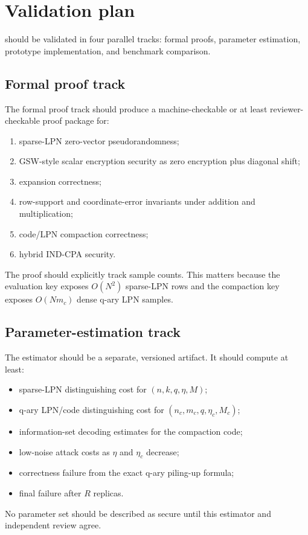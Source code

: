 \section{Validation plan}

\sable{} should be validated in four parallel tracks: formal proofs, parameter estimation, prototype implementation, and benchmark comparison.

\subsection{Formal proof track}

The formal proof track should produce a machine-checkable or at least reviewer-checkable proof package for:
\begin{enumerate}
    \item sparse-LPN zero-vector pseudorandomness;
    \item GSW-style scalar encryption security as zero encryption plus diagonal shift;
    \item expansion correctness;
    \item row-support and coordinate-error invariants under addition and multiplication;
    \item code/LPN compaction correctness;
    \item hybrid IND-CPA security.
\end{enumerate}
The proof should explicitly track sample counts.  This matters because the evaluation key exposes $O(N^2)$ sparse-LPN rows and the compaction key exposes $O(Nm_c)$ dense q-ary LPN samples.

\subsection{Parameter-estimation track}

The estimator should be a separate, versioned artifact.  It should compute at least:
\begin{itemize}
    \item sparse-LPN distinguishing cost for $(n,k,q,\eta,M)$;
    \item q-ary LPN/code distinguishing cost for $(n_c,m_c,q,\eta_c,M_c)$;
    \item information-set decoding estimates for the compaction code;
    \item low-noise attack costs as $\eta$ and $\eta_c$ decrease;
    \item correctness failure from the exact q-ary piling-up formula;
    \item final failure after $R$ replicas.
\end{itemize}
No parameter set should be described as secure until this estimator and independent review agree.

